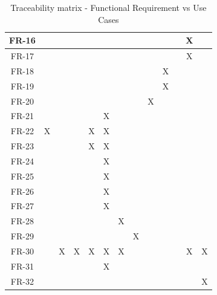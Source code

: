 \begin{table}
\begin{tabular}{| c | *{12}{c}|}
    FR-16   &       &       &       &       &       &       &       &       &       &       & X     &          \\ \hline
    FR-17   &       &       &       &       &       &       &       &       &       &       & X     &          \\ \hline
    FR-18   &       &       &       &       &       &       &       &       & X     &       &       &          \\ \hline
    FR-19   &       &       &       &       &       &       &       &       & X     &       &       &          \\ \hline
    FR-20   &       &       &       &       &       &       &       & X     &       &       &       &          \\ \hline
    FR-21   &       &       &       &       & X     &       &       &       &       &       &       &          \\ \hline
    FR-22   & X     &       &       & X     & X     &       &       &       &       &       &       &          \\ \hline
    FR-23   &       &       &       & X     & X     &       &       &       &       &       &       &          \\ \hline
    FR-24   &       &       &       &       & X     &       &       &       &       &       &       &          \\ \hline
    FR-25   &       &       &       &       & X     &       &       &       &       &       &       &          \\ \hline
    FR-26   &       &       &       &       & X     &       &       &       &       &       &       &          \\ \hline
    FR-27   &       &       &       &       & X     &       &       &       &       &       &       &          \\ \hline
    FR-28   &       &       &       &       &       & X     &       &       &       &       &       &          \\ \hline
    FR-29   &       &       &       &       &       &       &  X    &       &       &       &       &          \\ \hline
    FR-30   &       & X     & X     & X     & X     & X     &       &       &       &       & X     & X        \\ \hline
    FR-31   &       &       &       &       & X     &       &       &       &       &       &       &          \\ \hline
    FR-32   &       &       &       &       &       &       &       &       &       &       &       & X        \\ \hline
        \end{tabular}
\caption{Traceability matrix - Functional Requirement vs Use Cases}
\label{T:traceability_matrix_fr_vs_uc}
\end{table}


